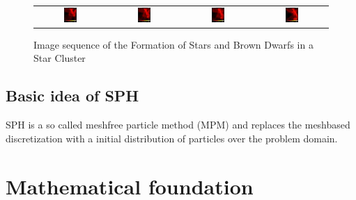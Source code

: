 \begin{figure}[htp]
\begin{tabular}{cccc}
	\includegraphics[width=0.2\textwidth]{../figures/sph_bates_starcluster_12.jpg} 
&   \includegraphics[width=0.2\textwidth]{../figures/sph_bates_starcluster_13.jpg}  
&   \includegraphics[width=0.2\textwidth]{../figures/sph_bates_starcluster_14.jpg}
&   \includegraphics[width=0.2\textwidth]{../figures/sph_bates_starcluster_15.jpg}
\\

\end{tabular}
\caption{Image sequence of the Formation of Stars and Brown Dwarfs in a Star Cluster}
\label{fig:SPHStarCluster}
\end{figure}

\subsection{Basic idea of SPH}
SPH is a so called meshfree particle method (MPM) and replaces the meshbased discretization with a initial distribution of particles over the problem domain. 

\section{Mathematical foundation}

